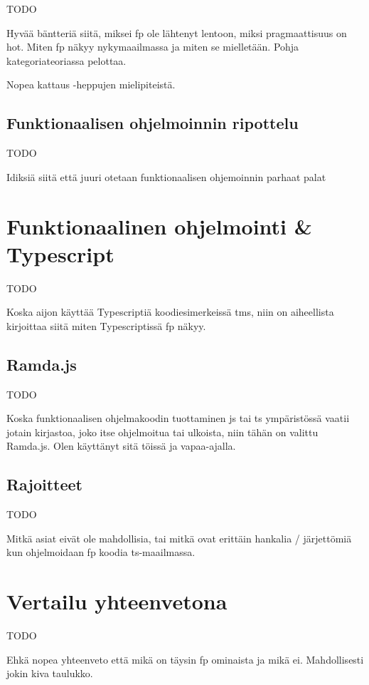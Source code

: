 TODO

Hyvää bäntteriä siitä, miksei fp ole lähtenyt lentoon, miksi pragmaattisuus on hot. Miten fp näkyy nykymaailmassa ja miten se mielletään. Pohja kategoriateoriassa pelottaa.

Nopea kattaus  -heppujen mielipiteistä.

\subsection{Funktionaalisen ohjelmoinnin ripottelu}

TODO

Idiksiä siitä että juuri otetaan funktionaalisen ohjemoinnin parhaat palat

\section{Funktionaalinen ohjelmointi \& Typescript}


TODO

Koska aijon käyttää Typescriptiä koodiesimerkeissä tms, niin on aiheellista kirjoittaa siitä miten Typescriptissä \gls{fp} näkyy.

\subsection{Ramda.js}

TODO

Koska funktionaalisen ohjelmakoodin tuottaminen \gls{js} tai \gls{ts} ympäristössä vaatii jotain kirjastoa, joko itse ohjelmoitua tai ulkoista, niin tähän on valittu Ramda.js. Olen käyttänyt sitä töissä ja vapaa-ajalla.

\subsection{Rajoitteet}

TODO

Mitkä asiat eivät ole mahdollisia, tai mitkä ovat erittäin hankalia / järjettömiä kun ohjelmoidaan \gls{fp} koodia \gls{ts}-maailmassa.


\section{Vertailu yhteenvetona}

TODO

Ehkä nopea yhteenveto että mikä on täysin \gls{fp} ominaista ja mikä ei. Mahdollisesti jokin kiva taulukko.